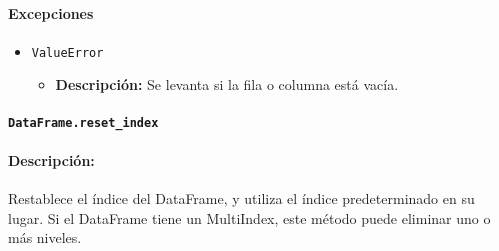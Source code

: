         \paragraph{\textbf{Excepciones}}
        \begin{itemize}
            \item \texttt{ValueError}
                \begin{itemize}
                    \item \textbf{Descripción:} Se levanta si la fila o columna está vacía.
                \end{itemize}
        \end{itemize}

        \paragraph{\texttt{DataFrame.reset\_index}}

        \paragraph{Descripción:}
        Restablece el índice del DataFrame, y utiliza el índice predeterminado en su lugar.
        Si el DataFrame tiene un MultiIndex, este método puede eliminar uno o más niveles.

